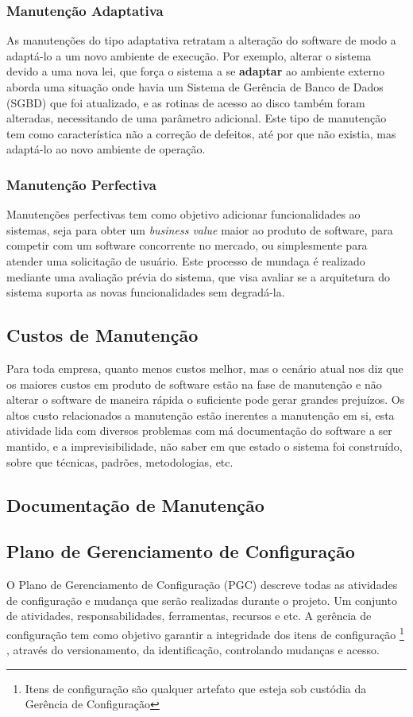 \subsubsection{Manutenção Adaptativa}
As manutenções do tipo adaptativa retratam a alteração do software de modo a adaptá-lo a um novo ambiente de execução. Por exemplo, alterar o sistema devido a uma nova lei, que força o sistema a se \textbf{adaptar} ao ambiente externo  aborda uma situação onde havia um Sistema de  Gerência de Banco de Dados (SGBD) que foi atualizado, e as rotinas de acesso ao disco também foram alteradas, necessitando de uma parâmetro adicional. Este tipo de manutenção tem como característica não a correção de defeitos, até por que não existia, mas adaptá-lo ao novo ambiente de operação.
\subsubsection{Manutenção Perfectiva}
Manutenções perfectivas tem como objetivo adicionar funcionalidades ao sistemas, seja para obter um \textit{business value} maior ao produto de software, para competir com um software concorrente no mercado, ou simplesmente para atender uma solicitação de usuário. Este processo de mundaça é realizado mediante uma avaliação prévia  do sistema, que visa avaliar se a arquitetura do sistema suporta as novas funcionalidades sem degradá-la.
\subsection{Custos de Manutenção}
Para toda empresa, quanto menos custos melhor, mas o cenário atual nos diz que os maiores custos em produto de software estão na fase de manutenção
e não alterar o software de maneira rápida o suficiente pode gerar grandes prejuízos. Os altos custo relacionados a manutenção estão inerentes a manutenção em si, esta atividade lida com diversos problemas com má documentação do software a ser mantido, e a imprevisibilidade, não saber em que estado o sistema foi construído, sobre que técnicas, padrões, metodologias, etc. 
\subsection{Documentação de Manutenção}

\subsection{Plano de Gerenciamento de Configuração}
O Plano de Gerenciamento de Configuração (PGC) descreve todas as atividades de configuração e mudança que serão realizadas durante o projeto. Um conjunto de atividades, responsabilidades, ferramentas, recursos e etc. A gerência de configuração tem como objetivo garantir a integridade dos itens de configuração \footnote{Itens de configuração são qualquer artefato que esteja sob custódia da Gerência de Configuração} , através do versionamento, da identificação, controlando mudanças e acesso. 
